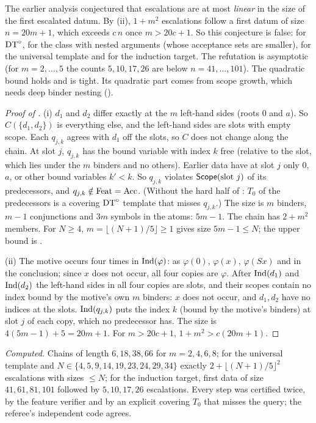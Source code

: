 \noindent The earlier analysis conjectured that escalations are at most \emph{linear} in the size of the first escalated datum. By (ii), $1+m^2$ escalations follow a first datum of size $n=20m+1$, which exceeds $c\,n$ once $m>20c+1$. So this conjecture is false: for $\mathrm{DT}^{\circ}$, for the class with nested arguments (whose acceptance sets are smaller), for the universal template and for the induction target. The refutation is asymptotic (for $m=2,\dots,5$ the counts $5,10,17,26$ are below $n=41,\dots,101$). The quadratic bound holds and is tight. Its quadratic part comes from scope growth, which needs deep binder nesting ().

\begin{proof}[Proof of ]
(i) $d_1$ and $d_2$ differ exactly at the $m$ left-hand sides (roots $0$ and $a$). So $C(\{d_1,d_2\})$ is everything else, and the left-hand sides are slots with empty scope. Each $q_{j,k}$ agrees with $d_1$ off the slots, so $C$ does not change along the chain. At slot $j$, $q_{j,k}$ has the bound variable with index $k$ free (relative to the slot, which lies under the $m$ binders and no others). Earlier data have at slot $j$ only $0$, $a$, or other bound variables $k'<k$. So $q_{j,k}$ violates $\mathsf{Scope}(\text{slot }j)$ of its predecessors, and $q_{j,k}\notin\mathrm{Feat}=\mathrm{Acc}$. (Without the hard half of : $T_0$ of the predecessors is a covering $\mathrm{DT}^{\circ}$ template that misses $q_{j,k}$.) The size is $m$ binders, $m-1$ conjunctions and $3m$ symbols in the atoms: $5m-1$. The chain has $2+m^2$ members. For $N\ge4$, $m=\lfloor(N+1)/5\rfloor\ge1$ gives size $5m-1\le N$; the upper bound is .

(ii) The motive occurs four times in $\mathrm{Ind}(\varphi)$: as $\varphi(0)$, $\varphi(x)$, $\varphi(Sx)$ and in the conclusion; since $x$ does not occur, all four copies are $\varphi$. After $\mathrm{Ind}(d_1)$ and $\mathrm{Ind}(d_2)$ the left-hand sides in all four copies are slots, and their scopes contain no index bound by the motive's own $m$ binders: $x$ does not occur, and $d_1,d_2$ have no indices at the slots. $\mathrm{Ind}(q_{j,k})$ puts the index $k$ (bound by the motive's binders) at slot $j$ of each copy, which no predecessor has. The size is $4(5m-1)+5=20m+1$. For $m>20c+1$, $1+m^2>c(20m+1)$.
\end{proof}

\emph{Computed.} Chains of length $6,18,38,66$ for $m=2,4,6,8$; for the universal template and $N\in\{4,5,9,14,19,23,24,29,34\}$ exactly $2+\lfloor(N+1)/5\rfloor^2$ escalations with sizes $\le N$; for the induction target, first data of size $41,61,81,101$ followed by $5,10,17,26$ escalations. Every step was certified twice, by the feature verifier and by an explicit covering $T_0$ that misses the query; the referee's independent code agrees.

